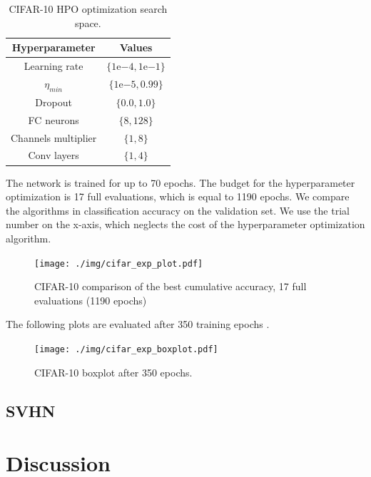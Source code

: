\begin{table}[H]
    \centering
    \begin{tabular}{cc}
        \textbf{Hyperparameter} & \textbf{Values} \\ \midrule
        Learning rate & $\{1\mathrm{e}{-4}, 1\mathrm{e}{-1}\}$ \\
        $\eta_{min}$ & $\{1\mathrm{e}{-5}, 0.99\}$ \\
        Dropout & $\{0.0, 1.0\}$ \\
        FC neurons & $\{8, 128\}$ \\
        Channels multiplier & $\{1, 8\}$ \\
        Conv layers & $\{1, 4\}$ \\
    \end{tabular}
    \caption{CIFAR-10 HPO optimization search space.}
    \label{tc10}
\end{table}

The network is trained for up to 70 epochs. The budget for the hyperparameter optimization is 17 full evaluations, which is equal to 1190 epochs. We compare the algorithms in classification accuracy on the validation set. We use the trial number on the x-axis, which neglects the cost of the hyperparameter optimization algorithm.

\begin{figure}[H]
    \centering
    \texttt{[image: ./img/cifar\_exp\_plot.pdf]}
    \caption{CIFAR-10 comparison of the best cumulative accuracy, 17 full evaluations (1190 epochs)}
\end{figure}

The following plots are evaluated after 350 training epochs .

\begin{figure}[H]
    \centering
    \texttt{[image: ./img/cifar\_exp\_boxplot.pdf]}
    \caption{CIFAR-10 boxplot after 350 epochs.}
\end{figure}


\subsection{SVHN}


\section{Discussion}
